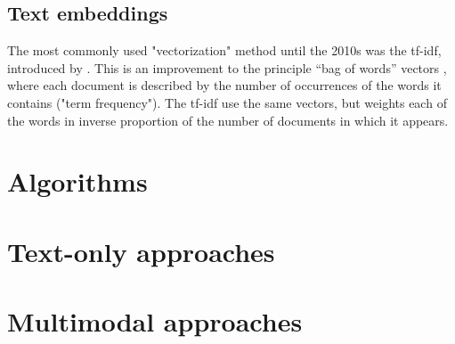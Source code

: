 \subsection{Text embeddings}
The most commonly used "vectorization" method until the 2010s
was the tf-idf, introduced by \citet{sparck_1972_statistical}. This is an improvement to the principle “bag of words” vectors \cite{harris1954distributional}, where each document is described by the
number of occurrences of the words it contains ("term frequency"). The tf-idf use the same vectors, but weights each of the words in inverse proportion of the number of documents in which it appears.

\section{Algorithms}

\section{Text-only approaches}

\section{Multimodal approaches}